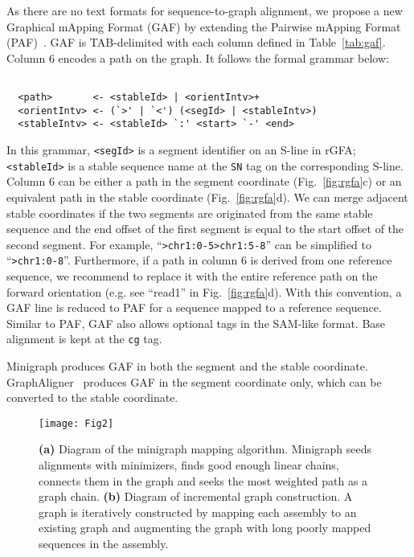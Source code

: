 \documentclass[twocolumn]{bmcart}
\begin{document}
As there are no text formats for sequence-to-graph alignment, we propose a new
Graphical mApping Format (GAF) by extending the Pairwise mApping Format
(PAF)~\cite{Li:2016aa}. GAF is TAB-delimited with each column defined in
Table~\ref{tab:gaf}. Column 6 encodes a path on the graph. It follows the
formal grammar below:

{\footnotesize
\begin{verbatim}

  <path>       <- <stableId> | <orientIntv>+
  <orientIntv> <- (`>' | `<') (<segId> | <stableIntv>)
  <stableIntv> <- <stableId> `:' <start> `-' <end>

\end{verbatim}}

{\flushleft
In this grammar, {\tt <segId>} is a segment identifier on an S-line in rGFA;
{\tt <stableId>} is a stable sequence name at the {\tt SN} tag on the
corresponding S-line. Column 6 can be either a path in the segment coordinate
(Fig.~\ref{fig:rgfa}c) or an equivalent path in the stable coordinate
(Fig.~\ref{fig:rgfa}d). We can merge adjacent stable coordinates if the two
segments are originated from the same stable sequence and the end offset of the
first segment is equal to the start offset of the second segment. For example,
``{\tt >chr1:0-5>chr1:5-8}'' can be simplified to ``{\tt >chr1:0-8}''.
Furthermore, if a path in column 6 is derived from one reference sequence, we
recommend to replace it with the entire reference path on the forward
orientation (e.g. see ``read1'' in Fig.~\ref{fig:rgfa}d). With this convention,
a GAF line is reduced to PAF for a sequence mapped to a reference sequence.
Similar to PAF, GAF also allows optional tags in the SAM-like format. Base
alignment is kept at the {\tt cg} tag.}

Minigraph produces GAF in both the segment and the stable coordinate.
GraphAligner~\cite{Rautiainen810812} produces GAF in the segment coordinate
only, which can be converted to the stable coordinate.

\begin{figure}[t]
\texttt{[image: Fig2]}
\caption{ {\bf (a)} Diagram of the minigraph
  mapping algorithm. Minigraph seeds alignments with minimizers, finds good
  enough linear chains, connects them in the graph and seeks the most weighted
  path as a graph chain. {\bf (b)} Diagram of incremental graph construction. A
  graph is iteratively constructed by mapping each assembly to an existing
  graph and augmenting the graph with long poorly mapped sequences in the
  assembly.}\label{fig:mg}
\end{figure}
\end{document}
